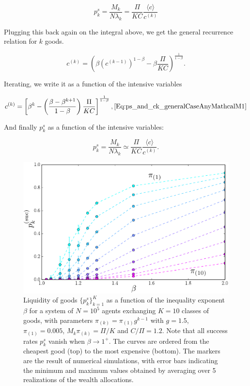 \begin{equation}
p_k^s = \frac{M_k}{N \lambda_k} = \frac{\Pi}{K C} \frac{\langle c \rangle}{c^{(k)}}
\end{equation}

Plugging this back again on the integral above, we get the general recurrence relation for $k$ goods.

\begin{equation}
c^{(k)} = \left(\beta \left( c^{(k-1)} \right)^{1-\beta} - \beta \frac{\Pi}{K C} \right)^{\frac{1}{1-\beta}}.
\end{equation}

Iterating, we write it as a function of the intensive variables 

\begin{equation}
c^{(k)} = \left[ \beta^k  - \left( \frac{\beta - \beta^{k+1}}{1-\beta} \right) \frac{\Pi}{K C} \right] ^{\frac{1}{1-\beta}},
\eqref{Eq:ps_and_ck_generalCaseAnyMathcalM1}
\end{equation}
 
And finally $p^s_k$ as a function of the intensive variables:

\begin{equation}
p_k^s = \frac{M_k}{N \lambda_k} \simeq \frac{\Pi}{K C} \frac{\langle c \rangle}{c^{(k)}}.
 \label{Eq:ps_and_ck_generalCaseAnyMathcalM2}
\end{equation}


\begin{figure}
\includegraphics[width=\textwidth]{figs_ineq/cropping-K=10_e=1p2_g=1p5_ps_prediction_adjustedcapital-crop.pdf}
\caption{Liquidity of goods $\{p^s_k\}_{k=1}^K$  as a function of the inequality exponent $\beta$ for a system of $N=10^5$ agents exchanging $K=10$ classes of goods, with parameters $\pi_{(k)}=\pi_{(1)}g^{k-1}$ with $g=1.5$, $\pi_{(1)}=0.005$, $M_k\pi_{(k)}=\Pi/K$ and $C/\Pi=1.2$. Note that all success rates $p^s_k$ vanish when $\beta \to 1^+$.  The curves are ordered from the cheapest good (top) to the most expensive (bottom). The markers are the result of numerical simulations, with error bars indicating the minimum and maximum values obtained by averaging over 5 realizations of the wealth allocations.}
\label{Fig:K10_ps_beta}
\end{figure}

